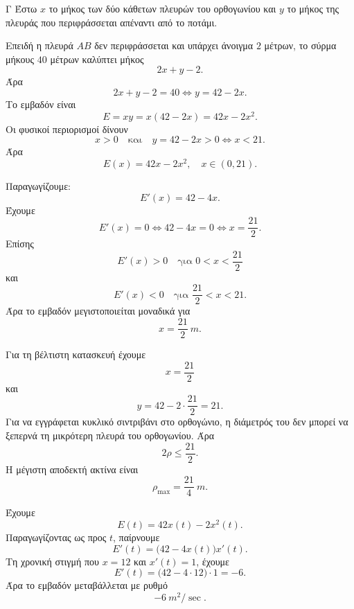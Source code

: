 \begin{thema}{Γ}
Έστω $x$ το μήκος των δύο κάθετων πλευρών του ορθογωνίου και $y$ το μήκος της πλευράς που περιφράσσεται απέναντι από το ποτάμι.
\begin{erwthma}
\item Επειδή η πλευρά $AB$ δεν περιφράσσεται και υπάρχει άνοιγμα $2$ μέτρων, το σύρμα μήκους $40$ μέτρων καλύπτει μήκος
\[
2x+y-2.
\]
Άρα
\[
2x+y-2=40
\Leftrightarrow y=42-2x.
\]
Το εμβαδόν είναι
\[
E=x y=x(42-2x)=42x-2x^2.
\]
Οι φυσικοί περιορισμοί δίνουν
\[
x>0
\quad\text{και}\quad
y=42-2x>0\Leftrightarrow x<21.
\]
Άρα
\[
{E(x)=42x-2x^2,\quad x\in(0,21)}.
\]

\item Παραγωγίζουμε:
\[
E'(x)=42-4x.
\]
Έχουμε
\[
E'(x)=0\Leftrightarrow 42-4x=0\Leftrightarrow x=\frac{21}{2}.
\]
Επίσης
\[
E'(x)>0\quad\text{για }0<x<\frac{21}{2}
\]
και
\[
E'(x)<0\quad\text{για }\frac{21}{2}<x<21.
\]
Άρα το εμβαδόν μεγιστοποιείται μοναδικά για
\[
{x=\frac{21}{2}\ \si{m}}.
\]

\item Για τη βέλτιστη κατασκευή έχουμε
\[
x=\frac{21}{2}
\]
και
\[
y=42-2\cdot\frac{21}{2}=21.
\]
Για να εγγράφεται κυκλικό σιντριβάνι στο ορθογώνιο, η διάμετρός του δεν μπορεί να ξεπερνά τη μικρότερη πλευρά του ορθογωνίου. Άρα
\[
2\rho\leq \frac{21}{2}.
\]
Η μέγιστη αποδεκτή ακτίνα είναι
\[
{\rho_{\max}=\frac{21}{4}\ \si{m}}.
\]

\item Έχουμε
\[
E(t)=42x(t)-2x^2(t).
\]
Παραγωγίζοντας ως προς $t$, παίρνουμε
\[
E'(t)=\bigl(42-4x(t)\bigr)x'(t).
\]
Τη χρονική στιγμή που $x=12$ και $x'(t)=1$, έχουμε
\[
E'(t)=\bigl(42-4\cdot12\bigr)\cdot1=-6.
\]
Άρα το εμβαδόν μεταβάλλεται με ρυθμό
\[
{-6\ \si{m^2}/\sec}.
\]
\end{erwthma}
\end{thema}

